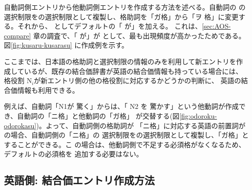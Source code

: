 \documentclass[japanese]{jnlp}
\newcommand{\eng}[1]{}
\newcommand{\izj}[1]{}
\newcommand{\abs}{}
\newcommand{\sbj}{}
\newcommand{\obj}{}
\newcommand{\ul}[1]{}
\def\mpt#1{}
\renewcommand{\mpt}[1]{}
\begin{document}
自動詞側エントリから他動詞側エントリを作成する方法を述べる。自動詞の
\sbj の選択制限を\obj の選択制限として複製し、格助詞を「ガ格」から「ヲ
格」に変更する。それから、
\abs としてデフォルトの「\izj{主体} が」を加える。
これは、\ref{sec:AOS-compare} 章の調査で、「\izj{主体} が」が
\abs{}として、最も出現頻度が高かったためである。
図\ref{fig:kusaru-kusarasu} に作成例を示す。

\mpt{前提は？ 対象とする結合価情報で必須な物は？ TT}

ここまでは、日本語の格助詞と選択制限の情報のみを利用して新エントリを作
成しているが、既存の結合価辞書が英語の結合価情報も持っている場合には、
格役割 N$_i$が新エントリ側の他の格役割に対応するかどうかの判断に、
英語の結合価情報も利用できる。


例えば、自動詞「N1\izj{主体 動物}が \ul{N3\izj{*}に} 驚く」\eng{N1 be
  surprised at/\ul{by N3} }からは、「\ul{N1\izj{*}が} N2\izj{主体 動物}
を 驚かす」という他動詞が作成でき、自動詞の「ニ格」と他動詞の「ガ格」
が交替する(図\ref{fig:odoroku-odorokasu})。よって、自動詞側の格助詞が
「ニ格」に対応する英語の前置詞が\eng{by} の場合、自動詞側の「ニ格」の
選択制限を\abs{}の選択制限として複製し、「ガ格」とすることができる。こ
の場合は、他動詞側で不足する必須格がなくなるため、デフォルトの必須格を
追加する必要はない。


\subsection{英語側: 結合価エントリ作成方法} \label{sec:create_eng} 
\end{document}
